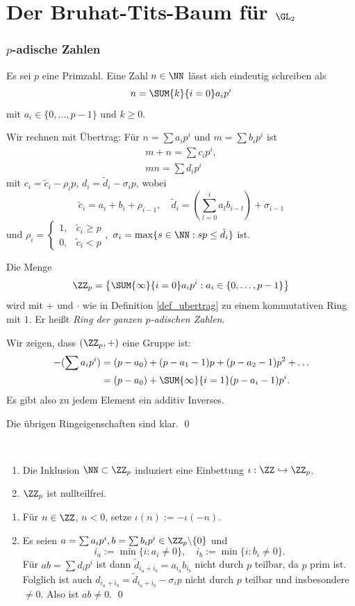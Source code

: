 \part{Der Bruhat-Tits-Baum für $\GL_2$}

\section{$p$-adische Zahlen}\label{sec_padisch}

Es sei $p$ eine Primzahl. Eine Zahl $n\in\NN$ lässt sich eindeutig
schreiben als
\[
n = \SUM{k}{i=0} a_i p^i
\]
mit $a_i\in\{0,\ldots,p-1\}$ und $k\geq 0$.

\BEM\label{def_ubertrag}
Wir rechnen mit Übertrag: Für $n=\sum a_i p^i$ und
$m=\sum b_i p^i$ ist
\begin{gather*}
m+n = \sum c_i p^i, \\
mn = \sum d_i p^i
\end{gather*}
mit
$c_i = \tilde{c}_i - \rho_i p$,
$d_i = \tilde{d}_i - \sigma_i p$,
wobei 
\[
\tilde{c}_i=a_i+b_i+\rho_{i-1},\quad
\tilde{d}_i=(\sum_{l=0}^i a_l b_{i-l})+\sigma_{i-1}
\]
und
$\rho_i = \left\{\begin{matrix}
1, & \tilde{c}_i \geq p \\
0, & \tilde{c}_i < p
\end{matrix}\right.,$
$\sigma_i=\max\{s\in\NN:sp\leq \tilde{d}_i\}$
ist.

\DB Die Menge
\[
\ZZ_p = \left\{
\SUM{\infty}{i=0} a_i p^i : a_i \in \{0,\ldots,p-1\}
\right\}
\]
wird mit $+$ und $\cdot$ wie in Definition \ref{def_ubertrag}
zu einem kommutativen Ring mit $1$. Er heißt
\emph{Ring der ganzen $p$-adischen Zahlen}.

\bew Wir zeigen, dass $(\ZZ_p,+)$ eine Gruppe ist:
\begin{align*}
-(\sum a_i p^i) &= (p-a_0) + (p-a_1-1) p + (p-a_2-1) p^2 + \ldots \\
&= (p-a_0) + \SUM{\infty}{i=1} (p-a_i-1) p^i.
\end{align*}
Es gibt also zu jedem Element ein additiv Inverses.

Die übrigen Ringeigenschaften sind klar.
\qed

\PROP\ \begin{enumerate}
\item Die Inklusion $\NN\subset \ZZ_p$ induziert eine Einbettung
$\iota:\ZZ\hookrightarrow \ZZ_p$.
\item $\ZZ_p$ ist nullteilfrei.
\end{enumerate}
\bew \begin{enumerate}
\item Für $n\in\ZZ$, $n<0$, setze $\iota(n):=-\iota(-n)$.
\item Es seien $a=\sum a_i p^i, b=\sum b_i p^i \in \ZZ_p\backslash\{0\}$ und
\[
i_a := \min\{i:a_i \neq 0\},\quad
i_b := \min\{i:b_i \neq 0\}.
\]
Für $ab=\sum d_i p^i$ ist dann $\tilde{d}_{i_a+i_b}=a_{i_a}b_{i_b}$
nicht durch $p$ teilbar, da $p$ prim ist.
Folglich ist auch $d_{i_a+i_b}=\tilde{d}_{i_a+i_b}-\sigma_i p$
nicht durch $p$ teilbar und insbesondere $\neq 0$.
Also ist $ab\neq 0$.
\qed
\end{enumerate}

